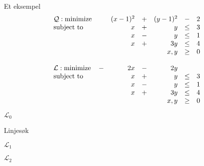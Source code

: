 \documentclass{beamer}
\begin{document}
\begin{frame}{Et eksempel}
\[
\begin{array}{lcrcrcl}
\mathcal{Q}: \textrm{minimize}           & &   (x-1)^2 &+&   (y-1)^2 & - &  2 \\
\textrm{subject to}         & &         x &+&         y &\leq& 3 \\
                            & &         x &-&         y &\leq& 1 \\
                            & &         x &+&       3 y &\leq& 4 \\
                 \multicolumn{5}{r}{x,y}                &\geq& 0 \\ \\
\mathcal{L}: \textrm{minimize}  &-&  2 x &-&       2 y &    &  \\
\textrm{subject to}         & &         x &+&         y &\leq& 3 \\
                            & &         x &-&         y &\leq& 1 \\
                            & &         x &+&       3 y &\leq& 4 \\
                 \multicolumn{5}{r}{x,y}                &\geq& 0
\end{array}
\]
\end{frame}



\begin{frame}{$\mathcal{L}_0$}
\begin{center}

\end{center}
\end{frame}



\begin{frame}{Linjesøk}
\begin{center}

\end{center}
\end{frame}




\begin{frame}{$\mathcal{L}_1$}
\begin{center}

\end{center}
\end{frame}



\begin{frame}{$\mathcal{L}_2$}
\begin{center}

\end{center}
\end{frame}
\end{document}
